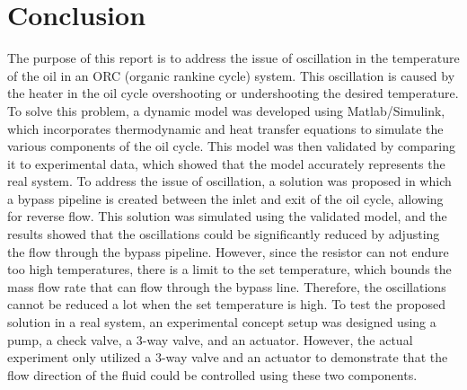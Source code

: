 \chapter{Conclusion}

The purpose of this report is to address the issue of oscillation in the temperature of the oil in an ORC (organic rankine cycle) system. This oscillation is caused by the heater in the oil cycle overshooting or undershooting the desired temperature. To solve this problem, a dynamic model was developed using Matlab/Simulink, which incorporates thermodynamic and heat transfer equations to simulate the various components of the oil cycle. This model was then validated by comparing it to experimental data, which showed that the model accurately represents the real system. To address the issue of oscillation, a solution was proposed in which a bypass pipeline is created between the inlet and exit of the oil cycle, allowing for reverse flow. This solution was simulated using the validated model, and the results showed that the oscillations could be significantly reduced by adjusting the flow through the bypass pipeline. However, since the resistor can not endure too high temperatures, there is a limit to the set temperature, which bounds the mass flow rate that can flow through the bypass line. Therefore, the oscillations cannot be reduced a lot when the set temperature is high. To test the proposed solution in a real system, an experimental concept setup was designed using a pump, a check valve, a 3-way valve, and an actuator. However, the actual experiment only utilized a 3-way valve and an actuator to demonstrate that the flow direction of the fluid could be controlled using these two components.